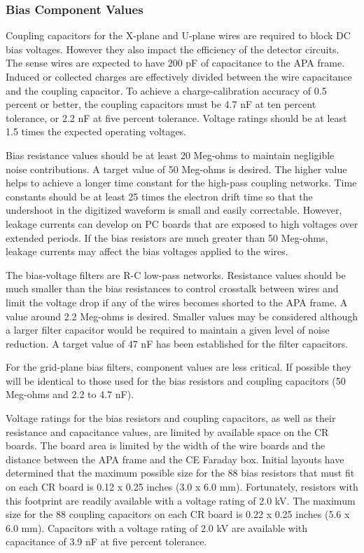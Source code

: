\subsubsection{Bias Component Values}
\label{subsec:bias_comp_values}

Coupling capacitors for the X-plane and U-plane wires are required to block DC bias voltages.
However they also impact the efficiency of the detector circuits.
The sense wires are expected to have 200 pF of capacitance to the APA frame.
Induced or collected charges are effectively divided between the wire capacitance and the coupling capacitor.
To achieve a charge-calibration accuracy of 0.5 percent or better,
the coupling capacitors must be 4.7 nF at ten percent tolerance, or 2.2 nF at five percent tolerance.
Voltage ratings should be at least 1.5 times the expected operating voltages.

Bias resistance values should be at least 20 Meg-ohms to maintain negligible noise contributions.
A target value of 50 Meg-ohms is desired.
The higher value helps to achieve a longer time constant for the high-pass coupling networks.
Time constants should be at least 25 times the electron drift time so that the undershoot in the digitized waveform
is small and easily correctable.
However, leakage currents can develop on PC boards that are exposed to high voltages over extended periods.
If the bias resistors are much greater than 50 Meg-ohms, leakage currents may affect the bias voltages applied to the wires.

The bias-voltage filters are R-C low-pass networks.
Resistance values should be much smaller than the bias resistances to control crosstalk between wires
and limit the voltage drop if any of the wires becomes shorted to the APA frame.
A value around 2.2 Meg-ohms is desired.
Smaller values may be considered although a larger filter capacitor would be required to maintain a given level of noise reduction.
A target value of 47 nF has been established for the filter capacitors.

For the grid-plane bias filters, component values are less critical.
If possible they will be identical to those used for the bias resistors and coupling capacitors
(50 Meg-ohms and 2.2 to 4.7 nF).

Voltage ratings for the bias resistors and coupling capacitors, as well as their resistance and capacitance values,
are limited by available space on the CR boards.
The board area is limited by the width of the wire boards and the distance between the APA frame and the CE Faraday box.
Initial layouts have determined that the maximum possible size for the 88 bias resistors that must fit on each CR board
is 0.12 x 0.25 inches (3.0 x 6.0 mm).
Fortunately, resistors with this footprint are readily available with a voltage rating of 2.0 kV.
The maximum size for the 88 coupling capacitors on each CR board is 0.22 x 0.25 inches (5.6 x 6.0 mm).
Capacitors with a voltage rating of 2.0 kV are available with capacitance of 3.9 nF at five percent tolerance.

